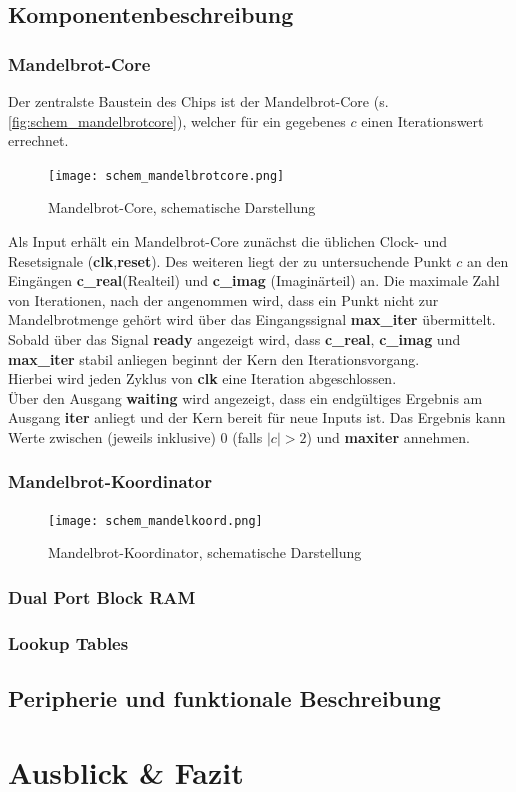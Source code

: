 \documentclass[a4paper,12pt,onesided]{report}
\begin{document}
\section{Komponentenbeschreibung}
\subsection{Mandelbrot-Core}
Der zentralste Baustein des Chips ist der Mandelbrot-Core (s. \autoref{fig:schem_mandelbrotcore}), welcher für ein gegebenes $c$ einen Iterationswert errechnet.
\begin{figure}[H]
	\centering
	\texttt{[image: schem\_mandelbrotcore.png]}
	\caption{Mandelbrot-Core, schematische Darstellung}
	\label{fig:schem_mandelbrotcore}
\end{figure}
Als Input erhält ein Mandelbrot-Core zunächst die üblichen Clock- und Resetsignale (\textbf{clk},\textbf{reset}).
Des weiteren liegt der zu untersuchende Punkt $c$ an den Eingängen \textbf{c\_real}(Realteil) und \textbf{c\_imag} (Imaginärteil) an.
Die maximale Zahl von Iterationen, nach der angenommen wird, dass ein Punkt nicht zur Mandelbrotmenge gehört wird über das Eingangssignal \textbf{max\_iter} übermittelt.\\
Sobald über das Signal \textbf{ready} angezeigt wird, dass \textbf{c\_real}, \textbf{c\_imag} und \textbf{max\_iter} stabil anliegen beginnt der Kern den Iterationsvorgang.\\
Hierbei wird jeden Zyklus von \textbf{clk} eine Iteration abgeschlossen.\\
Über den Ausgang \textbf{waiting} wird angezeigt, dass ein endgültiges Ergebnis am Ausgang \textbf{iter} anliegt und der Kern bereit für neue Inputs ist.
Das Ergebnis kann Werte zwischen (jeweils inklusive) 0 (falls $|c|>2$) und \textbf{maxiter} annehmen. 

\subsection{Mandelbrot-Koordinator}
\begin{figure}[H]
	\centering
	\texttt{[image: schem\_mandelkoord.png]}
	\caption{Mandelbrot-Koordinator, schematische Darstellung}
	\label{fig:schem_mandelbrotkoord}
\end{figure}

\subsection{Dual Port Block RAM}
\subsection{Lookup Tables}
\section{Peripherie und funktionale Beschreibung}

\chapter{Ausblick \& Fazit}


{}

\end{document}
